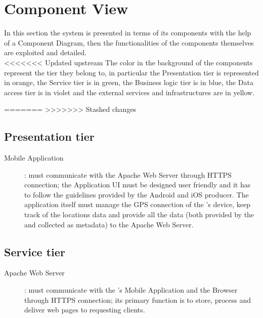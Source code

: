 \documentclass[../../DD.tex]{subfiles}
\begin{document}
\section{Component View\label{sect:2.2}}
 In this section the system is presented in terms of its components with the help of a Component Diagram, then the functionalities of the components themselves are exploited and detailed.\\

<<<<<<< Updated upstream
The color in the background of the components represent the tier they belong to, in particular the Presentation tier is represented in orange, the Service tier is in green, the Business logic tier is in blue, the Data access tier is in violet and the external services and infrastructures are in yellow.

=======
>>>>>>> Stashed changes
	
\subsection{Presentation tier\label{sect:2.2.1}}
	\begin{description}
	\item[Mobile Application]: must communicate with the Apache Web Server through HTTPS connection; the Application UI must be designed user friendly and it has to follow the guidelines provided by the Android and iOS producer. The application itself must manage the GPS connection of the 's device, keep track of the locations data and provide all the data (both provided by the  and collected as metadata) to the Apache Web Server.
	\end{description}
	
\subsection{Service tier\label{sect:2.2.2}}
	\begin{description}
	\item[Apache Web Server]: must communicate with the 's Mobile Application and the  Browser through HTTPS connection; its primary function is to store, process and deliver web pages to requesting clients.
	\end{description}
	
\end{document}
